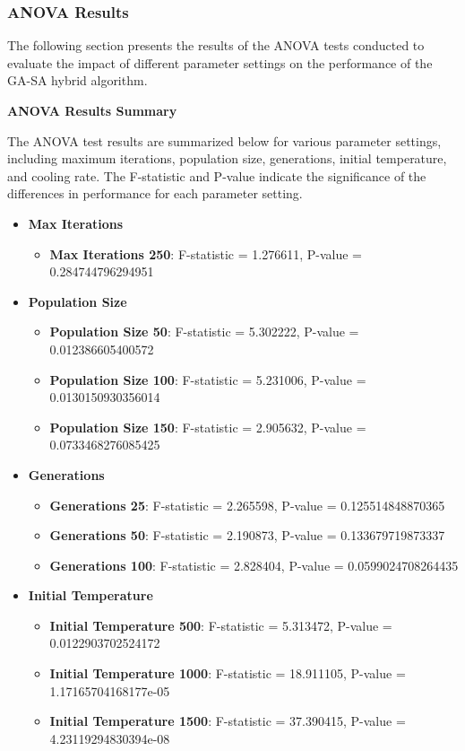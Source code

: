 \documentclass{article}
\begin{document}
    \subsubsection{ANOVA Results}

    The following section presents the results of the ANOVA tests conducted to evaluate the impact of different parameter settings on the performance of the GA-SA hybrid algorithm.

    \textbf{ANOVA Results Summary}

    The ANOVA test results are summarized below for various parameter settings, including maximum iterations, population size, generations, initial temperature, and cooling rate. The F-statistic and P-value indicate the significance of the differences in performance for each parameter setting.

    \begin{itemize}
        \item \textbf{Max Iterations}
        \begin{itemize}
            \item \textbf{Max Iterations 250}: F-statistic = 1.276611, P-value = 0.284744796294951
        \end{itemize}
        \item \textbf{Population Size}
        \begin{itemize}
            \item \textbf{Population Size 50}: F-statistic = 5.302222, P-value = 0.012386605400572
            \item \textbf{Population Size 100}: F-statistic = 5.231006, P-value = 0.0130150930356014
            \item \textbf{Population Size 150}: F-statistic = 2.905632, P-value = 0.0733468276085425
        \end{itemize}
        \item \textbf{Generations}
        \begin{itemize}
            \item \textbf{Generations 25}: F-statistic = 2.265598, P-value = 0.125514848870365
            \item \textbf{Generations 50}: F-statistic = 2.190873, P-value = 0.133679719873337
            \item \textbf{Generations 100}: F-statistic = 2.828404, P-value = 0.0599024708264435
        \end{itemize}
        \item \textbf{Initial Temperature}
        \begin{itemize}
            \item \textbf{Initial Temperature 500}: F-statistic = 5.313472, P-value = 0.0122903702524172
            \item \textbf{Initial Temperature 1000}: F-statistic = 18.911105, P-value = 1.17165704168177e-05
            \item \textbf{Initial Temperature 1500}: F-statistic = 37.390415, P-value = 4.23119294830394e-08
        \end{itemize}
    \end{itemize}
\end{document}
